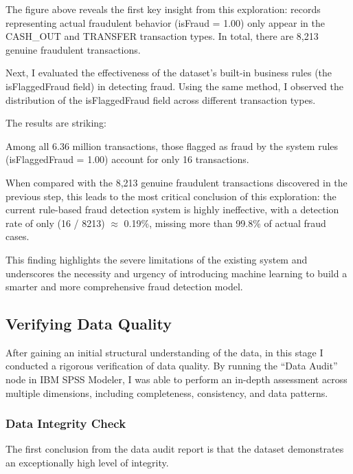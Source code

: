 \documentclass[sigplan,screen]{acmart}
\begin{document}
\vspace{0.3cm}

The figure above reveals the first key insight from this exploration: records representing actual fraudulent behavior (isFraud = 1.00) only appear in the CASH\_OUT and TRANSFER transaction types. In total, there are 8,213 genuine fraudulent transactions.

Next, I evaluated the effectiveness of the dataset's built-in business rules (the isFlaggedFraud field) in detecting fraud. Using the same method, I observed the distribution of the isFlaggedFraud field across different transaction types.

The results are striking:

Among all 6.36 million transactions, those flagged as fraud by the system rules (isFlaggedFraud = 1.00) account for only 16 transactions.

When compared with the 8,213 genuine fraudulent transactions discovered in the previous step, this leads to the most critical conclusion of this exploration: the current rule-based fraud detection system is highly ineffective, with a detection rate of only (16 / 8213) $\approx$ 0.19\%, missing more than 99.8\% of actual fraud cases.

This finding highlights the severe limitations of the existing system and underscores the necessity and urgency of introducing machine learning to build a smarter and more comprehensive fraud detection model.

\subsection{Verifying Data Quality}
    
    After gaining an initial structural understanding of the data, in this stage I conducted a rigorous verification of data quality. By running the ``Data Audit'' node in IBM SPSS Modeler, I was able to perform an in-depth assessment across multiple dimensions, including completeness, consistency, and data patterns.
    
\subsubsection{Data Integrity Check}
    
    The first conclusion from the data audit report is that the dataset demonstrates an exceptionally high level of integrity.

\vspace{0.3cm}
\end{document}
